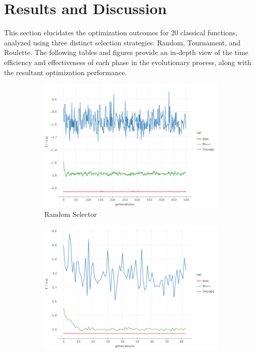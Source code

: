\section{Results and Discussion}
\label{sec:fn_opt:results}

    This section elucidates the optimization outcomes for 20 classical functions, analyzed using three distinct selection 
    strategies: Random, Tournament, and Roulette. The following tables and figures provide an in-depth view of the time 
    efficiency and effectiveness of each phase in the evolutionary process, along with the resultant optimization 
    performance.

    \begin{figure}[ht!]
        \centering
        \begin{subfigure}{.45\textwidth}
            \centering  
            \includegraphics[width=\linewidth]{img/cross_in_tray_random.png}
            \caption{Random Selector}
        \end{subfigure}
        \begin{subfigure}{.45\textwidth}
            \centering
            \includegraphics[width=\linewidth]{img/cross_in_tray_tournament.png}

\end{subfigure}
\end{figure}

